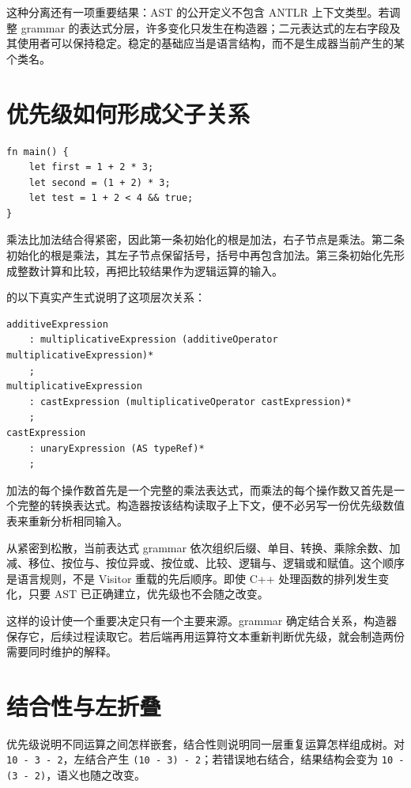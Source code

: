 这种分离还有一项重要结果：AST 的公开定义不包含 ANTLR 上下文类型。若调整 grammar 的表达式分层，许多变化只发生在构造器；二元表达式的左右字段及其使用者可以保持稳定。稳定的基础应当是语言结构，而不是生成器当前产生的某个类名。

\section{优先级如何形成父子关系}
\begin{lstlisting}[language=Rustless]
fn main() {
    let first = 1 + 2 * 3;
    let second = (1 + 2) * 3;
    let test = 1 + 2 < 4 && true;
}
\end{lstlisting}
乘法比加法结合得紧密，因此第一条初始化的根是加法，右子节点是乘法。第二条初始化的根是乘法，其左子节点保留括号，括号中再包含加法。第三条初始化先形成整数计算和比较，再把比较结果作为逻辑运算的输入。

 的以下真实产生式说明了这项层次关系：
\begin{lstlisting}
additiveExpression
    : multiplicativeExpression (additiveOperator multiplicativeExpression)*
    ;
multiplicativeExpression
    : castExpression (multiplicativeOperator castExpression)*
    ;
castExpression
    : unaryExpression (AS typeRef)*
    ;
\end{lstlisting}
加法的每个操作数首先是一个完整的乘法表达式，而乘法的每个操作数又首先是一个完整的转换表达式。构造器按该结构读取子上下文，便不必另写一份优先级数值表来重新分析相同输入。

从紧密到松散，当前表达式 grammar 依次组织后缀、单目、转换、乘除余数、加减、移位、按位与、按位异或、按位或、比较、逻辑与、逻辑或和赋值。这个顺序是语言规则，不是 Visitor 重载的先后顺序。即使 C++ 处理函数的排列发生变化，只要 AST 已正确建立，优先级也不会随之改变。

这样的设计使一个重要决定只有一个主要来源。grammar 确定结合关系，构造器保存它，后续过程读取它。若后端再用运算符文本重新判断优先级，就会制造两份需要同时维护的解释。

\section{结合性与左折叠}
优先级说明不同运算之间怎样嵌套，结合性则说明同一层重复运算怎样组成树。对 \texttt{10 - 3 - 2}，左结合产生 \texttt{(10 - 3) - 2}；若错误地右结合，结果结构会变为 \texttt{10 - (3 - 2)}，语义也随之改变。

